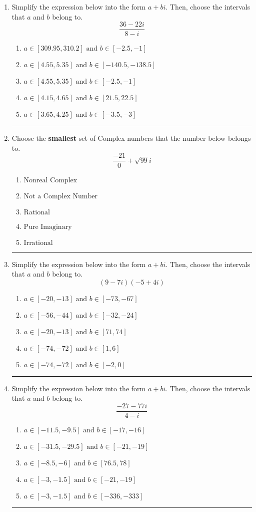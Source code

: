 \documentclass[14pt]{extbook}
\newcommand{\litem}[1]{\item#1\hspace*{-1cm}\rule{\textwidth}{0.4pt}}
\begin{document}
\begin{enumerate}
{\begin{enumerate}[label=\Alph*.]
\end{enumerate} }
\litem{
Simplify the expression below into the form $a+bi$. Then, choose the intervals that $a$ and $b$ belong to.\[ \frac{36 - 22 i}{8 - i} \]\begin{enumerate}[label=\Alph*.]
\item \( a \in [309.95, 310.2] \text{ and } b \in [-2.5, -1] \)
\item \( a \in [4.55, 5.35] \text{ and } b \in [-140.5, -138.5] \)
\item \( a \in [4.55, 5.35] \text{ and } b \in [-2.5, -1] \)
\item \( a \in [4.15, 4.65] \text{ and } b \in [21.5, 22.5] \)
\item \( a \in [3.65, 4.25] \text{ and } b \in [-3.5, -3] \)

\end{enumerate} }
\litem{
Choose the \textbf{smallest} set of Complex numbers that the number below belongs to.\[ \frac{-21}{0}+\sqrt{99} i \]\begin{enumerate}[label=\Alph*.]
\item \( \text{Nonreal Complex} \)
\item \( \text{Not a Complex Number} \)
\item \( \text{Rational} \)
\item \( \text{Pure Imaginary} \)
\item \( \text{Irrational} \)

\end{enumerate} }
\litem{
Simplify the expression below into the form $a+bi$. Then, choose the intervals that $a$ and $b$ belong to.\[ (9 - 7 i)(-5 + 4 i) \]\begin{enumerate}[label=\Alph*.]
\item \( a \in [-20, -13] \text{ and } b \in [-73, -67] \)
\item \( a \in [-56, -44] \text{ and } b \in [-32, -24] \)
\item \( a \in [-20, -13] \text{ and } b \in [71, 74] \)
\item \( a \in [-74, -72] \text{ and } b \in [1, 6] \)
\item \( a \in [-74, -72] \text{ and } b \in [-2, 0] \)

\end{enumerate} }
\litem{
Simplify the expression below into the form $a+bi$. Then, choose the intervals that $a$ and $b$ belong to.\[ \frac{-27 - 77 i}{4 - i} \]\begin{enumerate}[label=\Alph*.]
\item \( a \in [-11.5, -9.5] \text{ and } b \in [-17, -16] \)
\item \( a \in [-31.5, -29.5] \text{ and } b \in [-21, -19] \)
\item \( a \in [-8.5, -6] \text{ and } b \in [76.5, 78] \)
\item \( a \in [-3, -1.5] \text{ and } b \in [-21, -19] \)
\item \( a \in [-3, -1.5] \text{ and } b \in [-336, -333] \)


\end{enumerate}}
\end{enumerate}
\end{document}
